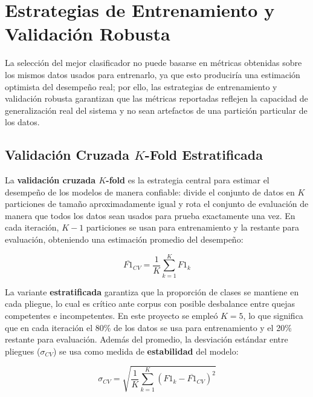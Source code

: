 \section{Estrategias de Entrenamiento y Validación Robusta}

La selección del mejor clasificador no puede basarse en métricas obtenidas sobre
los mismos datos usados para entrenarlo, ya que esto produciría una estimación
optimista del desempeño real; por ello, las estrategias de entrenamiento y
validación robusta garantizan que las métricas reportadas reflejen la capacidad
de generalización real del sistema y no sean artefactos de una partición
particular de los datos.

\subsection{Validación Cruzada $K$-Fold Estratificada}

La \textbf{validación cruzada $K$-fold} es la estrategia central para estimar
el desempeño de los modelos de manera confiable: divide el conjunto de datos en
$K$ particiones de tamaño aproximadamente igual y rota el conjunto de evaluación
de manera que todos los datos sean usados para prueba exactamente una vez. En
cada iteración, $K-1$ particiones se usan para entrenamiento y la restante para
evaluación, obteniendo una estimación promedio del desempeño:

\begin{equation}
  \overline{F1}_{CV}
  = \frac{1}{K} \sum_{k=1}^{K} F1_k
  \label{eq:cv}
\end{equation}

La variante \textbf{estratificada} garantiza que la proporción de clases se
mantiene en cada pliegue, lo cual es crítico ante corpus con posible desbalance
entre quejas competentes e incompetentes. En este proyecto se empleó $K = 5$,
lo que significa que en cada iteración el 80\% de los datos se usa para
entrenamiento y el 20\% restante para evaluación. Además del promedio, la
desviación estándar entre pliegues ($\sigma_{CV}$) se usa como medida de
\textbf{estabilidad} del modelo:

\begin{equation}
  \sigma_{CV} = \sqrt{\frac{1}{K} \sum_{k=1}^{K} (F1_k - \overline{F1}_{CV})^2}
  \label{eq:sigma}
\end{equation}

